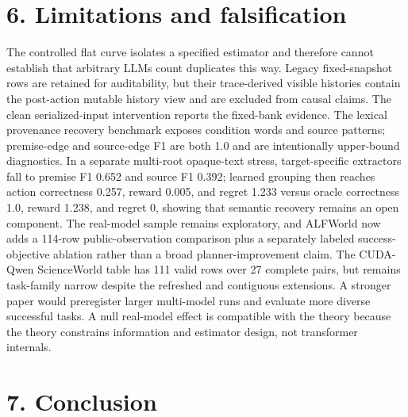 \documentclass[10pt]{article}
\begin{document}
\section{6. Limitations and falsification}

The controlled flat curve isolates a specified estimator and therefore cannot establish that arbitrary LLMs count duplicates this way. Legacy fixed-snapshot rows are retained for auditability, but their trace-derived visible histories contain the post-action mutable history view and are excluded from causal claims. The clean serialized-input intervention reports the fixed-bank evidence. The lexical provenance recovery benchmark exposes condition words and source patterns; premise-edge and source-edge F1 are both 1.0 and are intentionally upper-bound diagnostics. In a separate multi-root opaque-text stress, target-specific extractors fall to premise F1 0.652 and source F1 0.392; learned grouping then reaches action correctness 0.257, reward 0.005, and regret 1.233 versus oracle correctness 1.0, reward 1.238, and regret 0, showing that semantic recovery remains an open component. The real-model sample remains exploratory, and ALFWorld now adds a 114-row public-observation comparison plus a separately labeled success-objective ablation rather than a broad planner-improvement claim. The CUDA-Qwen ScienceWorld table has 111 valid rows over 27 complete pairs, but remains task-family narrow despite the refreshed and contiguous extensions. A stronger paper would preregister larger multi-model runs and evaluate more diverse successful tasks. A null real-model effect is compatible with the theory because the theory constrains information and estimator design, not transformer internals.

\section{7. Conclusion}
\end{document}
